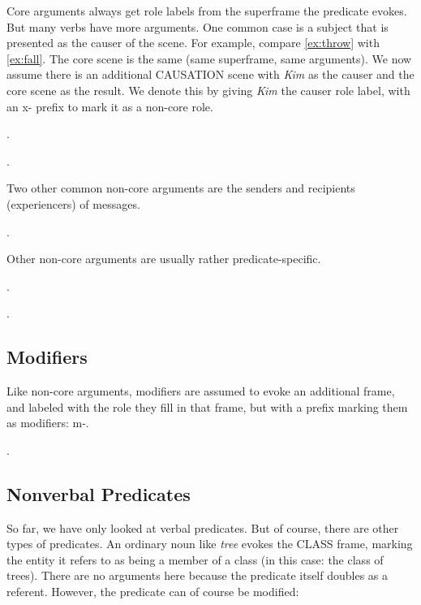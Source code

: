 \documentclass[a4paper]{article}
\newcommand{\fr}[1]{\textsf{#1}}
\newcommand{\rl}[1]{\textsf{#1}}
\begin{document}
Core arguments always get role labels from the superframe the predicate evokes.
But many verbs have more arguments. One common case is a subject that is
presented as the causer of the scene. For example, compare \ref{ex:throw} with
\ref{ex:fall}. The core scene is the same (same superframe, same arguments). We
now assume there is an additional \fr{CAUSATION} scene with \emph{Kim} as the
\rl{causer} and the core scene as the \rl{result}. We denote this by giving
\emph{Kim} the \rl{causer} role label, with an \rl{x-} prefix to mark it as a
non-core role.

\ex.\label{ex:throw}

\ex.

Two other common non-core arguments are the senders and recipients (experiencers) of messages.

\ex.

Other non-core arguments are usually rather predicate-specific.

\ex.

\ex.

\subsection{Modifiers}

Like non-core arguments, modifiers are assumed to evoke an additional frame,
and labeled with the role they fill in that frame, but with a prefix marking
them as modifiers: \rl{m-}.

\ex.

\subsection{Nonverbal Predicates}

So far, we have only looked at verbal predicates. But of course, there are
other types of predicates. An ordinary noun like \emph{tree} evokes the
\fr{CLASS} frame, marking the entity it refers to as being a member of a class
(in this case: the class of trees). There are no arguments here because the
predicate itself doubles as a referent. However, the predicate can of course be
modified:
\end{document}
